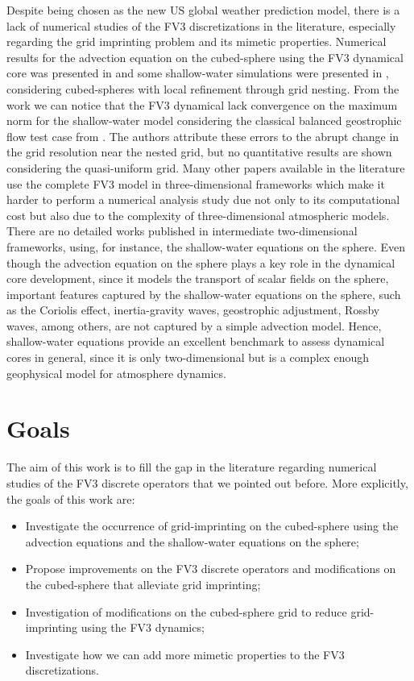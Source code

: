 Despite being chosen as the new US global weather prediction model,
there is a lack of numerical studies of the FV3 discretizations in the literature,
especially regarding the grid imprinting problem and its mimetic properties.
Numerical results for the advection equation on the cubed-sphere using the
FV3 dynamical core was presented in \citet{putman:2007} and some shallow-water 
simulations were presented in \citet{harris:2013}, considering cubed-spheres
with local refinement through grid nesting.
From the work \citet{harris:2013} we can notice that the FV3 dynamical
lack convergence on the maximum norm for the shallow-water model considering
the classical balanced geostrophic flow test case from \citet{will:1992}.
The authors attribute these errors to the abrupt change in the grid resolution
near the nested grid, but no quantitative results are shown considering the quasi-uniform grid.
Many other papers available in the literature use the complete FV3 model in three-dimensional
frameworks which make it harder to perform a numerical analysis study due not only to its computational cost
but also due to the complexity of three-dimensional atmospheric models.
There are no detailed works published in intermediate two-dimensional frameworks, using, for 
instance, the shallow-water equations on the sphere.
Even though the advection equation on the sphere plays a key role in the dynamical core development,
since it models the transport of scalar fields on the sphere, important features captured by the shallow-water
equations on the sphere, such as the Coriolis effect, inertia-gravity waves, geostrophic adjustment, Rossby waves,
among others, are not captured by a simple advection model.
Hence, shallow-water equations provide an excellent benchmark to assess dynamical cores in general,
since it is only two-dimensional but is a complex enough geophysical model for atmosphere dynamics.
\section{Goals}
The aim of this work is to fill the gap in the literature regarding numerical studies of the FV3 
discrete operators that we pointed out before.
More explicitly, the goals of this work are:
\begin{itemize}
  \item Investigate the occurrence of grid-imprinting on the cubed-sphere using the advection equations and
    the shallow-water equations on the sphere;
  \item Propose improvements on the FV3 discrete operators and modifications on the cubed-sphere that alleviate
    grid imprinting;
   \item Investigation of modifications on the cubed-sphere grid to reduce grid-imprinting using the FV3 dynamics;
  \item Investigate how we can add more mimetic properties to the FV3 discretizations.
\end{itemize}

